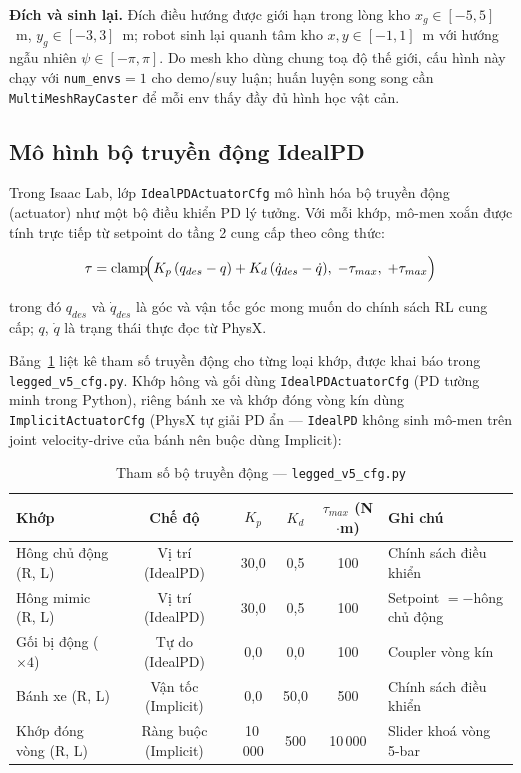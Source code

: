 \textbf{Đích và sinh lại.} Đích điều hướng được giới hạn trong lòng kho
$x_g\in[-5,5]$~m, $y_g\in[-3,3]$~m; robot sinh lại quanh tâm kho
$x,y\in[-1,1]$~m với hướng ngẫu nhiên $\psi\in[-\pi,\pi]$. Do mesh kho dùng
chung toạ độ thế giới, cấu hình này chạy với \texttt{num\_envs}${=}1$ cho
demo/suy luận; huấn luyện song song cần \texttt{MultiMeshRayCaster} để mỗi env
thấy đầy đủ hình học vật cản.

\subsection{Mô hình bộ truyền động IdealPD}
\label{sec:ideal_pd}

Trong Isaac Lab, lớp \texttt{IdealPDActuatorCfg} mô hình hóa bộ truyền động (actuator)
như một bộ điều khiển PD lý tưởng. Với mỗi khớp, mô-men xoắn được tính
trực tiếp từ setpoint do tầng 2 cung cấp theo công thức:

\begin{equation}
    \tau = \operatorname{clamp}\!\Bigl(
        K_p\,(q_{des} - q)
        + K_d\,(\dot{q}_{des} - \dot{q}),\;
        -\tau_{max},\; +\tau_{max}
    \Bigr)
    \label{eq:ideal_pd}
\end{equation}

trong đó $q_{des}$ và $\dot{q}_{des}$ là góc và vận tốc góc mong muốn
do chính sách RL cung cấp; $q$, $\dot{q}$ là trạng thái thực đọc từ
PhysX.

Bảng~\ref{tab:actuator_params} liệt kê tham số truyền động cho từng loại
khớp, được khai báo trong \texttt{legged\_v5\_cfg.py}. Khớp hông và gối dùng
\texttt{IdealPDActuatorCfg} (PD tường minh trong Python), riêng bánh xe và
khớp đóng vòng kín dùng \texttt{ImplicitActuatorCfg} (PhysX tự giải PD ẩn —
\texttt{IdealPD} không sinh mô-men trên joint velocity-drive của bánh nên buộc
dùng Implicit):

\begin{table}[H]
    \centering
    \caption{Tham số bộ truyền động --- \texttt{legged\_v5\_cfg.py}}
    \label{tab:actuator_params}
    \renewcommand{\arraystretch}{1.3}
    \begin{tabular}{|l|c|c|c|c|l|}
    \hline
    \textbf{Khớp} & \textbf{Chế độ} & $K_p$ & $K_d$ & $\tau_{max}$ (N$\cdot$m) & \textbf{Ghi chú} \\
    \hline
    Hông chủ động (R, L)   & Vị trí (IdealPD)   & 30{,}0  & 0{,}5 & 100   & Chính sách điều khiển \\
    Hông mimic (R, L)      & Vị trí (IdealPD)   & 30{,}0  & 0{,}5 & 100   & Setpoint $=-$hông chủ động \\
    Gối bị động ($\times4$) & Tự do (IdealPD)    & 0{,}0   & 0{,}0 & 100   & Coupler vòng kín \\
    Bánh xe (R, L)         & Vận tốc (Implicit) & 0{,}0   & 50{,}0& 500   & Chính sách điều khiển \\
    Khớp đóng vòng (R, L)  & Ràng buộc (Implicit)& 10\,000 & 500   & 10\,000 & Slider khoá vòng 5-bar \\
    \hline
    \end{tabular}
\end{table}

